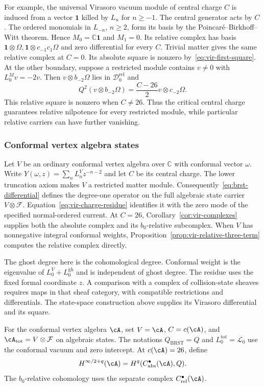 For example, the universal Virasoro vacuum module of central charge $C$ is induced from a vector $\mathbf1$ killed by $L_n$ for $n\geq-1$.
The central generator acts by $C$.
The ordered monomials in $L_{-n}$, $n\geq2$, form its basis by the Poincar\'e--Birkhoff--Witt theorem.
Hence $M_0=\mathbb C\mathbf1$ and $M_1=0$.
Its relative complex has basis $\mathbf1\otimes\Omega,\mathbf1\otimes c_{-1}c_1\Omega$ and zero differential for every $C$.
Trivial matter gives the same relative complex at $C=0$.
Its absolute square is nonzero by~\eqref{eq:vir-first-square}.
At the other boundary, suppose a restricted module contains $v\neq0$ with $L_0^Mv=-2v$.
Then $v\otimes b_{-2}\Omega$ lies in $\mathcal D_0^{\mathrm{rel}}$ and
\[
 Q^2(v\otimes b_{-2}\Omega)=\frac{C-26}{2}v\otimes c_{-2}\Omega.
\]
This relative square is nonzero when $C\neq26$.
Thus the critical central charge guarantees relative nilpotence for every restricted module, while particular relative carriers can have further vanishing.

\subsubsection{Conformal vertex algebra states}

Let $V$ be an ordinary conformal vertex algebra over $\mathbb C$ with conformal vector $\omega$.
Write
$Y(\omega,z)=\sum_nL_n^Vz^{-n-2}$ and let $C$ be its central charge.
The lower truncation axiom makes $V$ a restricted matter module.
Consequently~\eqref{eq:brst-differential} defines the degree-one operator on the full algebraic state carrier $V\otimes\mathcal F$.
Equation~\eqref{eq:vir-charge-residue} identifies it with the zero mode of the specified normal-ordered current.
At $C=26$, Corollary~\ref{cor:vir-complexes} supplies both the absolute complex and its $b_0$-relative subcomplex.
When $V$ has nonnegative integral conformal weights, Proposition~\ref{prop:vir-relative-three-term} computes the relative complex directly.

The ghost degree here is the cohomological degree.
Conformal weight is the eigenvalue of $L_0^V+L_0^{\mathrm{gh}}$ and is independent of ghost degree.
The residue uses the fixed formal coordinate $z$.
A comparison with a complex of collision-state sheaves requires maps in that sheaf category, with compatible restrictions and differentials.
The state-space construction above supplies its Virasoro differential and its square.

For the conformal vertex algebra $\cA$, set $V=\cA$, $C=c(\cA)$, and $\cA_{\mathrm{tot}}=V\otimes\mathcal F$ on algebraic states.
The notations $Q_{\mathrm{BRST}}=Q$ and $L_0^{\mathrm{tot}}=\mathcal L_0$ use the conformal vacuum and zero intercept.
At $c(\cA)=26$, define
\[
 H^{\infty/2+q}(\cA)=H^q(C_{\mathrm{abs}}^\bullet(\cA),Q).
\]
The $b_0$-relative cohomology uses the separate complex $C_{\mathrm{rel}}^\bullet(\cA)$.

